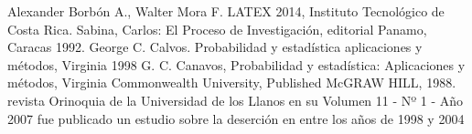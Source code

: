 \documentclass[conference]{IEEEtran}\usepackage[]{graphicx}\usepackage[]{color}
\begin{document}
\begin{itemize}
		 		 
 
\end{itemize} 
	
	
		
	\newpage
	\begin{thebibliography}{1}
		
		Alexander Borbón A., Walter Mora F. LATEX 2014, Instituto Tecnológico de Costa Rica.  
		Sabina, Carlos: El Proceso de Investigación, editorial Panamo, Caracas 1992.
		George C. Calvos. Probabilidad y estadística aplicaciones y métodos, Virginia 1998 
		G. C. Canavos, Probabilidad y estadística: Aplicaciones y métodos, Virginia Commonwealth University, Published McGRAW HILL, 1988.
		revista Orinoquia de la Universidad de los Llanos en su Volumen 11 - Nº 1 - Año 2007 fue publicado un estudio sobre la deserción en entre los años de 1998 y 2004
		
	\end{thebibliography}
	
\end{document}
